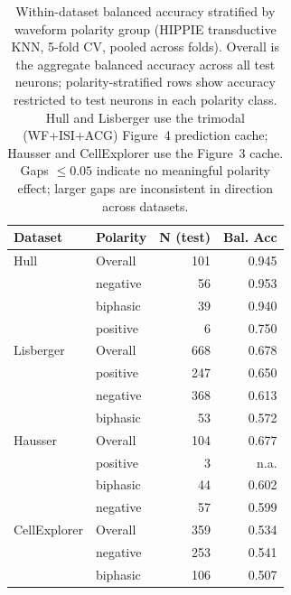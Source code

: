 \begin{table}[h!]
\centering
\caption{Within-dataset balanced accuracy stratified by waveform polarity group (HIPPIE transductive KNN, 5-fold CV, pooled across folds). Overall is the aggregate balanced accuracy across all test neurons; polarity-stratified rows show accuracy restricted to test neurons in each polarity class. Hull and Lisberger use the trimodal (WF+ISI+ACG) Figure~4 prediction cache; Hausser and CellExplorer use the Figure~3 cache. Gaps $\leq 0.05$ indicate no meaningful polarity effect; larger gaps are inconsistent in direction across datasets.}
\label{tab:polarity_within}
\begin{tabular}{llrr}
\hline
\textbf{Dataset} & \textbf{Polarity} & \textbf{N (test)} & \textbf{Bal. Acc} \\
\hline
Hull         & Overall    &  101 & 0.945 \\
             & negative   &   56 & 0.953 \\
             & biphasic   &   39 & 0.940 \\
             & positive   &    6 & 0.750 \\
Lisberger    & Overall    &  668 & 0.678 \\
             & positive   &  247 & 0.650 \\
             & negative   &  368 & 0.613 \\
             & biphasic   &   53 & 0.572 \\
Hausser      & Overall    &  104 & 0.677 \\
             & positive   &    3 & n.a. \\
             & biphasic   &   44 & 0.602 \\
             & negative   &   57 & 0.599 \\
CellExplorer & Overall    &  359 & 0.534 \\
             & negative   &  253 & 0.541 \\
             & biphasic   &  106 & 0.507 \\
\hline
\end{tabular}
\end{table}